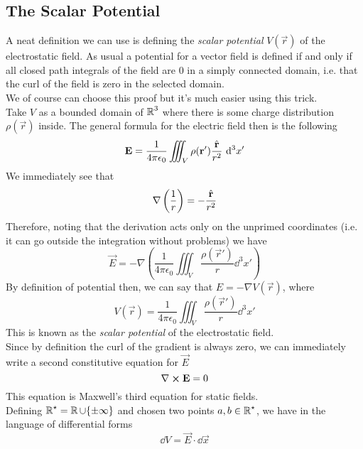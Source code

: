 \documentclass[../electromagnetism]{subfiles}
\begin{document}
\subsection{The Scalar Potential}
A neat definition we can use is defining the \textit{scalar potential} $V(\vec{r})$ of the electrostatic field. As usual a potential for a vector field is defined if and only if all closed path integrals of the field are $0$ in a simply connected domain, i.e. that the curl of the field is zero in the selected domain.\\
We of course can choose this proof but it's much easier using this trick.\\
Take $V$ as a bounded domain of $\operatorname{\mathbb{R}}^3$ where there is some charge distribution $\rho(\vec{r})$ inside. The general formula for the electric field then is the following
\begin{equation}
	\mathbf{E}=\frac{1}{4\pi\epsilon_0}\iiint_{V}^{}\rho(\mathbf{r}')\frac{\hat{\mathbf{r}}}{r^2}\ \mathrm{d}^3x'
	\label{eq:efieldpot}
\end{equation}
We immediately see that
\begin{equation*}
	\nabla\left( \frac{1}{r} \right)=-\frac{\hat{\mathbf{r}}}{r^2}
\end{equation*}
Therefore, noting that the derivation acts only on the unprimed coordinates (i.e. it can go outside the integration without problems) we have
\begin{equation}
	\vec{E}=-\nabla\left( \frac{1}{4\pi\epsilon_0}\iiint_V\frac{\rho(\vec{r}')}{r}\dd^3x' \right)
	\label{eq:trick}
\end{equation}
By definition of potential then, we can say that $E=-\nabla V(\vec{r})$, where
\begin{equation}
	V(\vec{r})=\frac{1}{4\pi\epsilon_0}\iiint_V\frac{\rho(\vec{r}')}{r}\dd^3x'
	\label{eq:scalarpot}
\end{equation}
This is known as the \textit{scalar potential} of the electrostatic field.\\
Since by definition the curl of the gradient is always zero, we can immediately write a second constitutive equation for $\vec{E}$
\begin{equation}
	\nabla\cross\mathbf{E}=0
	\label{eq:3rdmaxwell}
\end{equation}
This equation is Maxwell's third equation for static fields.\\
Defining $\operatorname{\mathbb{R}}^\star=\operatorname{\mathbb{R}}\cup\{\pm\infty\}$ and chosen two points $a,b\in\operatorname{\mathbb{R}}^\star$, we have in the language of differential forms
\begin{equation}
	\dd V=\vec{E}\cdot\dd\vec{x}
	\label{eq:extder}
\end{equation}
\end{document}
